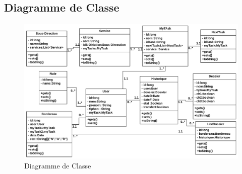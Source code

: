  
 \subsection{Diagramme de Classe}
\begin{figure}[H]
	\centering
	\includegraphics[width=1\linewidth]{images/class01}
	\caption{Diagramme de Classe}
	\label{fig:class01}
\end{figure}



 
   